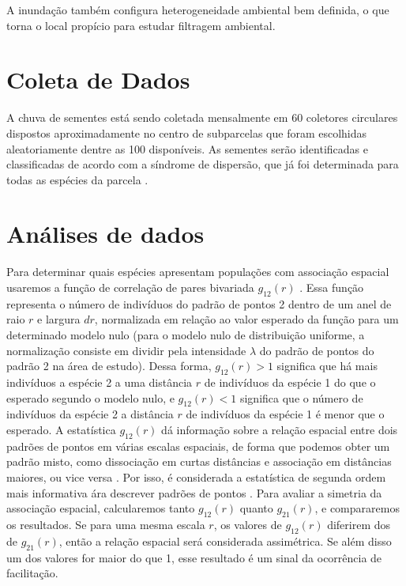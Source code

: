 \documentclass[twoside,12pt,a4paper]{report}
\begin{document}
A inundação também configura heterogeneidade ambiental bem definida, o que torna o local
propício para estudar filtragem ambiental.

\section{Coleta de Dados}

A chuva de sementes está sendo coletada mensalmente em 60 coletores circulares dispostos
aproximadamente no centro de subparcelas que foram escolhidas aleatoriamente dentre as 100
disponíveis. As sementes serão identificadas e classificadas de acordo com a síndrome de
dispersão, que já foi determinada para todas as espécies da parcela \citep{martins2014}.

\section{Análises de dados}

Para determinar quais espécies apresentam populações com associação espacial usaremos a função de correlação
de pares bivariada
$g_{12}(r)$ \citep{Stoyan1994}. Essa função representa o
número de indivíduos do padrão de pontos 2 dentro de um anel de raio $r$ e largura $dr$, 
normalizada em relação ao valor esperado da função para um determinado modelo nulo (para o
modelo nulo de distribuição uniforme, a normalização consiste em dividir pela intensidade
$\lambda$ do padrão de pontos do padrão 2 na área de estudo). Dessa forma, $g_{12}(r) > 1$ significa que há mais indivíduos a
espécie 2 a uma distância $r$ de indivíduos da espécie 1 do que o esperado segundo o modelo
nulo, e $g_{12}(r) < 1 $ significa que o número de indivíduos da espécie 2 a distância $r$ de
indivíduos da espécie 1 é menor
que o esperado. A estatística $g_{12}(r)$ dá informação sobre a relação espacial
entre dois padrões de pontos em várias escalas espaciais, de forma que podemos obter um padrão
misto, como dissociação em curtas distâncias e associação em distâncias maiores, ou vice
versa \citep{WiegandMoloney2004}. Por isso, é considerada a estatística de segunda
ordem mais informativa ára descrever padrões de pontos \citep{IllianBook}.  
Para avaliar a simetria da associação espacial, calcularemos tanto
$g_{12}(r)$ quanto $g_{21}(r)$, e compararemos os resultados. Se para uma mesma escala $r$,
os valores de $g_{12}(r)$ diferirem dos de $g_{21}(r)$, então a relação espacial será
considerada assimétrica. Se além disso um dos valores for maior do que 1, esse resultado é um
sinal da ocorrência de facilitação.
\end{document}
